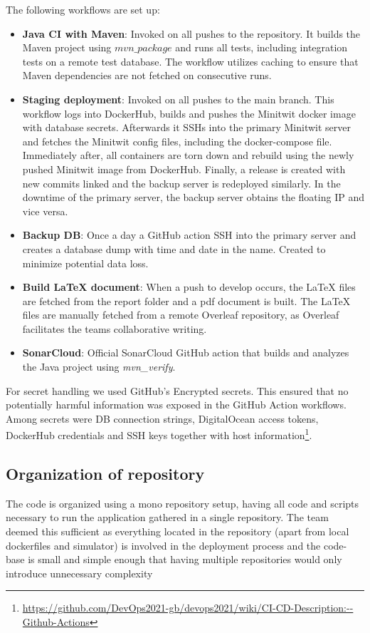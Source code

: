 The following workflows are set up:
\begin{itemize}
    \item \textbf{Java CI with Maven}: Invoked on all pushes to the repository. It builds the Maven project using $mvn\_package$ and runs all tests, including integration tests on a remote test database. The workflow utilizes caching to ensure that Maven dependencies are not fetched on consecutive runs. 
    \item \textbf{Staging deployment}: Invoked on all pushes to the main branch. This workflow logs into DockerHub, builds and pushes the Minitwit docker image with database secrets. Afterwards it SSHs into the primary Minitwit server and fetches the Minitwit config files, including the docker-compose file. Immediately after, all containers are torn down and rebuild using the newly pushed Minitwit image from DockerHub. Finally, a release is created with new commits linked and the backup server is redeployed similarly. In the downtime of the primary server, the backup server obtains the floating IP and vice versa. 
    \item \textbf{Backup DB}: Once a day a GitHub action SSH into the primary server and creates a database dump with time and date in the name. Created to minimize potential data loss.
    \item \textbf{Build LaTeX document}: When a push to develop occurs, the LaTeX files are fetched from the report folder and a pdf document is built. The LaTeX files are manually fetched from a remote Overleaf repository, as Overleaf facilitates the teams collaborative writing. 
    \item \textbf{SonarCloud}: Official SonarCloud GitHub action that builds and analyzes the Java project using \textit{mvn\_verify}. 
\end{itemize}
For secret handling we used GitHub's Encrypted secrets. This ensured that no potentially harmful information was exposed in the GitHub Action workflows. Among secrets were DB connection strings, DigitalOcean access tokens, DockerHub credentials and SSH keys together with host information\footnote{\url{https://github.com/DevOps2021-gb/devops2021/wiki/CI-CD-Description:--Github-Actions}}.


\subsection{Organization of repository}
The code is organized using a mono repository setup, having all code and scripts necessary to run the application gathered in a single repository. The team deemed this sufficient as everything located in the repository (apart from local dockerfiles and simulator) is involved in the deployment process and the code-base is small and simple enough that having multiple repositories would only introduce unnecessary complexity


